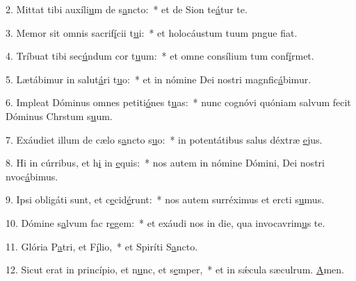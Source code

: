 2. Mittat tibi auxíli\uline{u}m de s\uline{a}ncto:~* et de Sion te\uline{á}tur te.\par 
3. Memor sit omnis sacrif\uline{í}cii t\uline{u}i:~* et holocáustum tuum pngue f\uline{i}at.\par 
4. Tríbuat tibi sec\uline{ú}ndum cor t\uline{u}um:~* et omne consílium tum conf\uline{í}rmet.\par 
5. Lætábimur in salut\uline{á}ri t\uline{u}o:~* et in nómine Dei nostri magnfic\uline{á}bimur.\par 
6. Impleat Dóminus omnes petiti\uline{ó}nes t\uline{u}as:~* nunc cognóvi quóniam salvum fecit Dóminus Chrstum s\uline{u}um.\par 
7. Exáudiet illum de cælo s\uline{a}ncto s\uline{u}o:~* in potentátibus salus déxtræ \uline{e}jus.\par 
8. Hi in cúrribus, et h\uline{i} in \uline{e}quis:~* nos autem in nómine Dómini, Dei nostri nvoc\uline{á}bimus.\par 
9. Ipsi obligáti sunt, et c\uline{e}cid\uline{é}runt:~* nos autem surréximus et ercti s\uline{u}mus.\par 
10. Dómine s\uline{a}lvum fac r\uline{e}gem:~* et exáudi nos in die, qua invocavrim\uline{u}s te.\par 
11. Glória P\uline{a}tri, et F\uline{í}lio,~* et Spiríti S\uline{a}ncto.\par 
12. Sicut erat in princípio, et n\uline{u}nc, et s\uline{e}mper,~* et in sǽcula sæculrum. \uline{A}men.\par 
